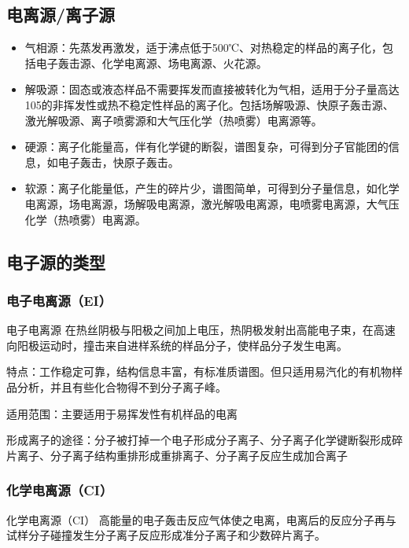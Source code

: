 \subsection{电离源/离子源}
\begin{itemize}
    \item 气相源：先蒸发再激发，适于沸点低于500℃、对热稳定的样品的离子化，包括电子轰击源、化学电离源、场电离源、火花源。
    \item 解吸源：固态或液态样品不需要挥发而直接被转化为气相，适用于分子量高达105的非挥发性或热不稳定性样品的离子化。包括场解吸源、快原子轰击源、激光解吸源、离子喷雾源和大气压化学（热喷雾）电离源等。
    \item 硬源：离子化能量高，伴有化学键的断裂，谱图复杂，可得到分子官能团的信息，如电子轰击，快原子轰击。
    \item 软源：离子化能量低，产生的碎片少，谱图简单，可得到分子量信息，如化学电离源，场电离源，场解吸电离源，激光解吸电离源，电喷雾电离源，大气压化学（热喷雾）电离源。
\end{itemize}
\subsection{电子源的类型}
 \subsubsection*{电子电离源（EI）}
    \begin{definition*}{电子电离源}
        在热丝阴极与阳极之间加上电压，热阴极发射出高能电子束，在高速向阳极运动时，撞击来自进样系统的样品分子，使样品分子发生电离。
    \end{definition*}
    特点：工作稳定可靠，结构信息丰富，有标准质谱图。但只适用易汽化的有机物样品分析，并且有些化合物得不到分子离子峰。

    适用范围：主要适用于易挥发性有机样品的电离

    

    \begin{note}
        形成离子的途径：分子被打掉一个电子形成分子离子、分子离子化学键断裂形成碎片离子、分子离子结构重排形成重排离子、分子离子反应生成加合离子
    \end{note}
\subsubsection*{化学电离源（CI）}
    \begin{definition*}{化学电离源（CI）}
        高能量的电子轰击反应气体使之电离，电离后的反应分子再与试样分子碰撞发生分子离子反应形成准分子离子和少数碎片离子。
    \end{definition*}
    
